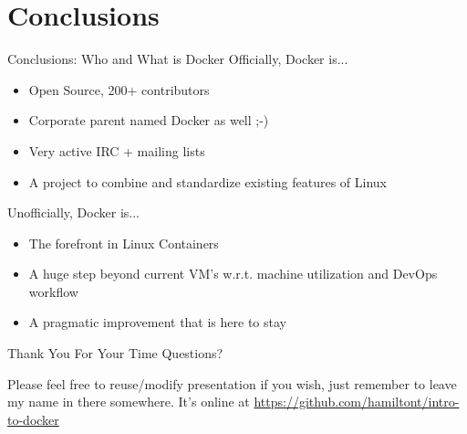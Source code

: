 \documentclass[xcolor=dvipsnames]{beamer}
\newcommand{\cpause}{}
\begin{document}
\section{Conclusions}
\begin{frame}{Conclusions: Who and What is Docker}
  Officially, Docker is... \cpause
  \begin{itemize}
  \item Open Source, 200+ contributors \cpause
  \item Corporate parent named Docker as well ;-) \cpause
  \item Very active IRC + mailing lists \cpause
  \item A project to combine and standardize existing features of Linux \cpause
  \end{itemize}

  Unofficially, Docker is... \cpause
  \begin{itemize}
  \item The forefront in Linux Containers \cpause
  \item A huge step beyond current VM's w.r.t. machine utilization and DevOps workflow \cpause
  \item A pragmatic improvement that is here to stay \cpause
  \end{itemize}
\end{frame}

\begin{frame}{Thank You For Your Time}
  Questions? 
  \vspace{10mm}

  Please feel free to reuse/modify presentation if you wish, just remember to 
  leave my name in there somewhere. It's online at \url{https://github.com/hamiltont/intro-to-docker}
\end{frame}
\end{document}
